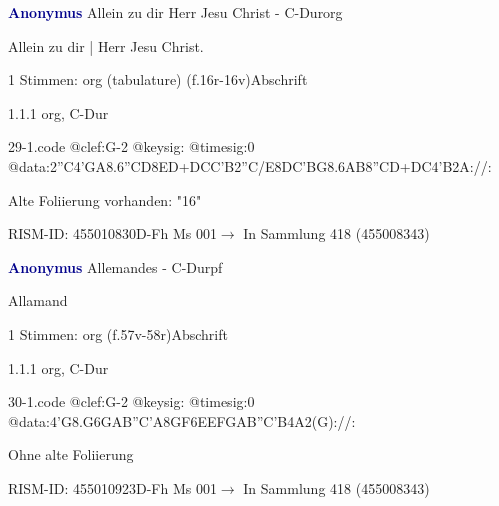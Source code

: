 \documentclass[twocolumn, 12pt]{book}
\begin{document}
\par \vspace{16pt} \textcolor{darkblue}{\textbf{Anonymus  }}\hfillplus{\textbf{[29]}}\newline Allein zu dir Herr Jesu Christ - C-Dur\newline org
\par \begin{itshape}[f.16r, at left:] Allein zu dir | Herr Jesu Christ.\end{itshape} 
\par \textcolor{darkblue}{}  1 Stimmen: org (tabulature)  (f.16r-16v)\newline Abschrift
\par 1.1.1  org, C-Dur  
\begin{filecontents*}{29-1.code}
@clef:G-2
@keysig:
@timesig:0
@data:2''C4'GA{8.6''CD8ED+}{DCC'B}2''C/E{8DC'BG}{8.6AB8''CD+}{DC}4'B2A://:
\end{filecontents*}
\newline %
\par Alte Foliierung vorhanden: "16"
\par RISM-ID: 455010830\newline D-Fh  Ms 001\newline $\rightarrow$ In Sammlung 418 (455008343)
      
\par \vspace{16pt} \textcolor{darkblue}{\textbf{Anonymus  }}\hfillplus{\textbf{[30]}}\newline Allemandes - C-Dur\newline pf
\par \begin{itshape}[f.57v, at left:] Allamand\end{itshape} 
\par \textcolor{darkblue}{}  1 Stimmen: org  (f.57v-58r)\newline Abschrift
\par 1.1.1  org, C-Dur  
\begin{filecontents*}{30-1.code}
@clef:G-2
@keysig:
@timesig:0
@data:4'G{8.G6G}{AB''C'A}{8GF}{6EEFG}{AB''C'B}4A2(G)://:
\end{filecontents*}
\newline %
\par Ohne alte Foliierung
\par RISM-ID: 455010923\newline D-Fh  Ms 001\newline $\rightarrow$ In Sammlung 418 (455008343)
      
\end{document}
